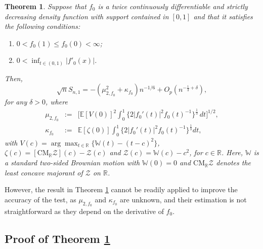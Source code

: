 \documentclass[12pt,letterpaper, twoside, openany]{article}
\theoremstyle{plain}
\newtheorem{theorem}{Theorem}[section]
\begin{document}
		\begin{theorem}\label{thm:monotone_log_like_conv}
			Suppose that $f_0$ is a twice continuously differentiable and strictly decreasing density function with support contained in $[0, 1]$ and that it satisfies the following conditions:
			\begin{enumerate}%
				\item[(i)] $0 < f_0(1) \leq f_0(0) < \infty$;
				\item[(ii)] $0 < \inf_{t \in (0,1)} |f'_0(x)|$.
			\end{enumerate}
			Then,
			\begin{equation*}
				\sqrt{n} S_{n,1} =  -(\mu^2_{2, f_0} + \kappa_{f_0})n^{-1/6} + O_p(n^{-\frac{1}{3} + \delta}),
			\end{equation*}
			for any $\delta > 0$, where
			\begin{eqnarray*}
				\mu_{2, f_0} &:=&  \bigg[ \mathbb{E}[V(0)]^2 \int_0^1 \{2|f_0'(t)|^2f_0(t)^{-1}\}^{\frac{1}{3}}\,dt \bigg]^{1/2},\\
				\kappa_{f_0} &:=& \mathbb{E}[\zeta(0)]\int_0^1 \{2|f_0'(t)|^2 f_0(t)^{-1}\}^{\frac{1}{3}}dt,
			\end{eqnarray*}	
			with $V(c) = \arg\max_{t\in\mathbb{R}} \{\mathbb{W}(t) - (t-c)^2\}$, \\ $\zeta(c) =  [\mathrm{CM}_\mathbb{R} \mathcal{Z}](c)-\mathcal{Z}(c)$ and $\mathcal{Z}(c) = \mathbb{W}(c) - c^2$, for $c \in \mathbb{R}$. Here, $\mathbb{W}$ is a standard two-sided Brownian motion with $\mathbb{W}(0) = 0$ and $\mathrm{CM}_\mathbb{R}\mathcal{Z}$ denotes the least concave majorant of  $\mathcal{Z}$ on $\mathbb{R}$.
		\end{theorem}

			
		However, the result in Theorem \ref{thm:monotone_log_like_conv} cannot be readily applied to improve the accuracy of the test, as $\mu_{2, f_0}$ and $\kappa_{f_0}$ are unknown, and their estimation is not straightforward as they depend on the derivative of $f_0$.  


\subsection{Proof of Theorem \ref{thm:monotone_log_like_conv}}
\end{document}
